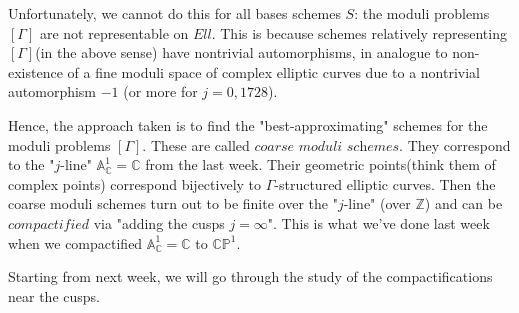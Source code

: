 \documentclass[a4paper,11pt]{article}
\begin{document}
Unfortunately, we cannot do this for all bases schemes $S$: the moduli problems $[\Gamma]$ are not representable on $Ell$.
This is because schemes relatively representing $[\Gamma]$(in the above sense) have nontrivial automorphisms, in analogue to non-existence of a fine moduli space of complex elliptic curves due to a nontrivial automorphism $-1$ (or more for $j=0,1728$).

Hence, the approach taken is to find the "best-approximating" schemes for the moduli problems $[\Gamma]$.
These are called $\textit{coarse moduli schemes}$.
They correspond to the "$j$-line" $\mathbb{A}^1_{\mathbb{C}}=\mathbb{C}$ from the last week.
Their geometric points(think them of complex points) correspond bijectively to $\Gamma$-structured elliptic curves.
Then the coarse moduli schemes turn out to be finite over the "$j$-line" (over $\mathbb{Z}$) and can be $\textit{compactified}$ via "adding the cusps $j=\infty$".
This is what we've done last week when we compactified $\mathbb{A}^1_{\mathbb{C}}=\mathbb{C}$ to $\mathbb{C}\mathbb{P}^1$.

Starting from next week, we will go through the study of the compactifications near the cusps.
\end{document}
